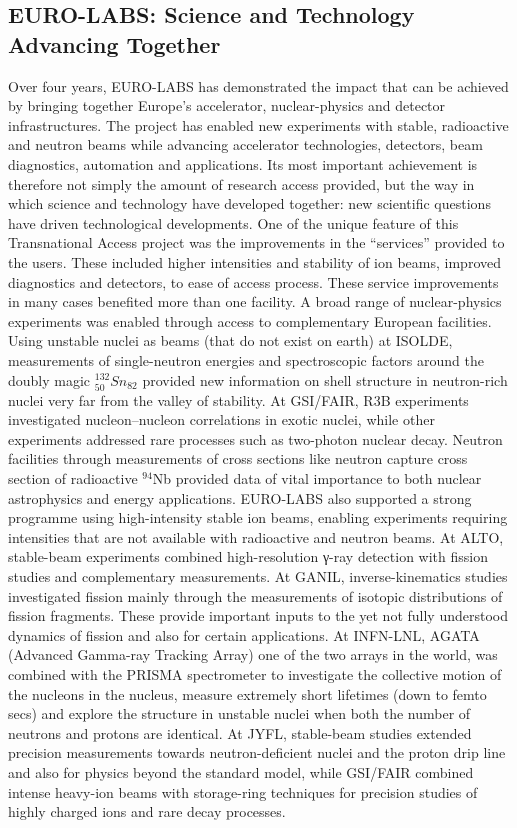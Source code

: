 \begin{itemize}
\section{EURO-LABS: Science and Technology Advancing Together}
Over four years, EURO-LABS has demonstrated the impact that can be achieved by bringing together Europe’s accelerator, nuclear-physics and detector infrastructures. The project has enabled new experiments with stable, radioactive and neutron beams while advancing accelerator technologies, detectors, beam diagnostics, automation and applications. Its most important achievement is therefore not simply the amount of research access provided, but the way in which science and technology have developed together: new scientific questions have driven technological developments. One of the unique feature of this Transnational Access project was the improvements in  the “services” provided to the users. These included higher intensities and stability of ion beams, improved diagnostics and detectors, to ease of access process. These service improvements in many cases benefited more than one facility.
A broad range of nuclear-physics experiments was enabled through access to complementary European facilities. Using unstable nuclei as beams (that do not exist on earth) at ISOLDE, measurements of single-neutron energies and spectroscopic factors around the doubly magic $^{132}_{50}Sn_{82}$ provided new information on shell structure in neutron-rich nuclei very far from the valley of stability. At GSI/FAIR, R3B experiments investigated nucleon–nucleon correlations in exotic nuclei, while other experiments addressed rare processes such as two-photon nuclear decay. Neutron facilities through measurements of cross sections like neutron capture cross section of radioactive $^{94}$Nb provided data of vital importance to both nuclear astrophysics and energy applications.
EURO-LABS also supported a strong programme using high-intensity stable ion beams, enabling experiments requiring intensities that are not available with radioactive and neutron  beams. At ALTO, stable-beam experiments combined high-resolution γ-ray detection with fission studies and complementary measurements. At GANIL, inverse-kinematics studies investigated fission mainly through the measurements of isotopic distributions of fission fragments. These provide important inputs to the yet not fully understood dynamics of fission and also for certain applications. At INFN-LNL, AGATA (Advanced Gamma-ray Tracking Array) one of the two arrays in the world, was combined with the PRISMA spectrometer to investigate the collective motion of the nucleons in the nucleus, measure extremely short lifetimes (down to femto secs) and explore the structure in unstable nuclei when both the number of neutrons and protons are identical. At JYFL, stable-beam studies extended precision measurements towards neutron-deficient nuclei and the proton drip line and also for physics beyond the standard model, while GSI/FAIR combined intense heavy-ion beams with storage-ring techniques for precision studies of highly charged ions and rare decay processes. 

\end{itemize}
